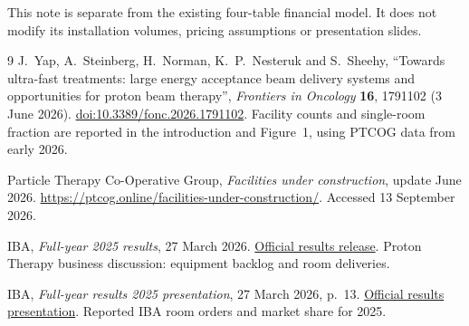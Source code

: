 \documentclass[11pt,a4paper]{article}
\begin{document}
This note is separate from the existing four-table financial model. It does
not modify its installation volumes, pricing assumptions or presentation slides.

\begin{thebibliography}{9}
\small
{}
J.~Yap, A.~Steinberg, H.~Norman, K.~P.~Nesteruk and S.~Sheehy,
``Towards ultra-fast treatments: large energy acceptance beam delivery systems
and opportunities for proton beam therapy'',
\emph{Frontiers in Oncology} \textbf{16}, 1791102 (3 June 2026).
\href{https://doi.org/10.3389/fonc.2026.1791102}{doi:10.3389/fonc.2026.1791102}.
Facility counts and single-room fraction are reported in the introduction and
Figure~1, using PTCOG data from early 2026.

Particle Therapy Co-Operative Group,
\emph{Facilities under construction}, update June 2026.
\url{https://ptcog.online/facilities-under-construction/}.
Accessed 13 September 2026.

IBA, \emph{Full-year 2025 results}, 27 March 2026.
\href{https://www.iba-worldwide.com/sites/default/files/2026-03/260327-iba-fy2025-results-en.pdf}{Official results release}.
Proton Therapy business discussion: equipment backlog and room deliveries.

IBA, \emph{Full-year results 2025 presentation}, 27 March 2026, p.~13.
\href{https://www.iba-worldwide.com/sites/default/files/2026-03/iba-fy25-results-presentation-en.pdf}{Official results presentation}.
Reported IBA room orders and market share for 2025.
\end{thebibliography}
\end{document}
